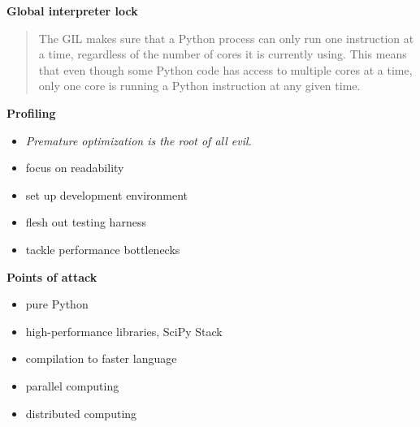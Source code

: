 \begin{frame}\textbf{Global interpreter lock}\vspace{0.3cm}

\begin{quote} The GIL makes sure that a Python process can only run one instruction at a time, regardless of the number of cores it is currently using. This means that even though some Python code has access to multiple cores at a time, only one core is running a Python instruction at any given time.
\end{quote}
\end{frame}
\begin{frame}\textbf{Profiling}\vspace{0.3cm}

\begin{itemize}\setlength\itemsep{1em}
    \item \textit{Premature optimization is the root of all evil.}
    \item focus on readability
    \item set up development environment
    \item flesh out testing harness
    \item tackle performance bottlenecks
\end{itemize}

\end{frame}
\begin{frame}\textbf{Points of attack}\vspace{0.3cm}

\begin{itemize}\setlength\itemsep{1em}
    \item pure Python
    \item high-performance libraries, SciPy Stack
    \item compilation to faster language
    \item parallel computing
    \item distributed computing
\end{itemize}

\end{frame}
\begin{frame}
	\begin{figure}[htp]\centering
	\end{figure}
\end{frame}
